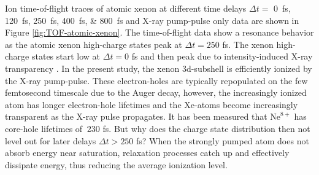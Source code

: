 Ion time-of-flight traces of atomic xenon at different time delays $\Delta t =$ \SIlist{0;120;250;400;800}{\femto\second} and X-ray pump-pulse only data are shown in Figure \ref{fig:TOF-atomic-xenon}. The time-of-flight data show a resonance behavior as the atomic xenon high-charge states peak at $\Delta t = 250$ fs. The xenon high-charge states start low at $\Delta t = 0$ fs and then peak due to intensity-induced X-ray transparency \citep{Young-2010-Nature,Schorb-2012-PRL}. In the present study, the xenon 3d-subshell is efficiently ionized by the X-ray pump-pulse. These electron-holes are typically repopulated on the few femtosecond timescale due to the Auger decay, however, the increasingly ionized atom has longer electron-hole lifetimes and the Xe-atoms become increasingly transparent as the X-ray pulse propagates. It has been measured that $\text{Ne}^{8+}$ has core-hole lifetimes of $~230$ fs. But why does the charge state distribution then not level out for later delays $\Delta t > 250$ fs? When the strongly pumped atom does not absorb energy near saturation, relaxation processes catch up and effectively dissipate energy, thus reducing the average ionization level.
